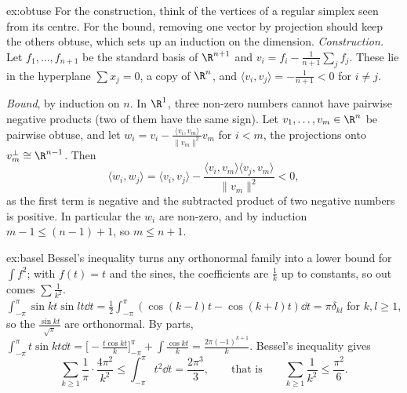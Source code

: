 \begin{solution}{ex:obtuse}
\idea For the construction, think of the vertices of a regular simplex seen from its centre. For the bound, removing
one vector by projection should keep the others obtuse, which sets up an induction on the dimension.
\writeup \emph{Construction.} Let $f_1,\dots,f_{n+1}$ be the standard basis of $\R^{n+1}$ and $v_i=f_i-\frac1{n+1}
\sum_jf_j$. These lie in the hyperplane $\sum x_j=0$, a copy of $\R^n$, and $\langle v_i,v_j\rangle=-\frac1{n+1}<0$ for
$i\ne j$.

\emph{Bound}, by induction on $n$. In $\R^1$, three non-zero numbers cannot have pairwise negative products (two of them
have the same sign). Let $v_1,\dots,v_m\in\R^n$ be pairwise obtuse, and let $w_i=v_i-\frac{\langle v_i,v_m\rangle}
{\|v_m\|^2}v_m$ for $i<m$, the projections onto $v_m^\perp\cong\R^{n-1}$. Then
\[
\langle w_i,w_j\rangle=\langle v_i,v_j\rangle-\frac{\langle v_i,v_m\rangle\langle v_j,v_m\rangle}{\|v_m\|^2}<0,
\]
as the first term is negative and the subtracted product of two negative numbers is positive. In particular the $w_i$
are non-zero, and by induction $m-1\le(n-1)+1$, so $m\le n+1$.
\end{solution}

\begin{solution}{ex:basel}
\idea Bessel's inequality turns any orthonormal family into a lower bound for $\int f^2$; with $f(t)=t$ and the sines,
the coefficients are $\frac1k$ up to constants, so out comes $\sum\frac1{k^2}$.
\writeup $\int_{-\pi}^\pi\sin kt\sin lt\dd t=\frac12\int_{-\pi}^\pi(\cos(k-l)t-\cos(k+l)t)\dd t=\pi\delta_{kl}$ for $k,l\ge1$,
so the $\frac{\sin kt}{\sqrt\pi}$ are orthonormal. By parts, $\int_{-\pi}^\pi t\sin kt\dd t=\bigl[-\frac{t\cos kt}k\bigr]
_{-\pi}^\pi+\int\frac{\cos kt}k=\frac{2\pi(-1)^{k+1}}k$. Bessel's inequality gives
\[
\sum_{k\ge1}\frac1\pi\cdot\frac{4\pi^2}{k^2}\le\int_{-\pi}^\pi t^2\dd t=\frac{2\pi^3}3,\qquad\text{that is}\qquad
\sum_{k\ge1}\frac1{k^2}\le\frac{\pi^2}6.
\]
\end{solution}

